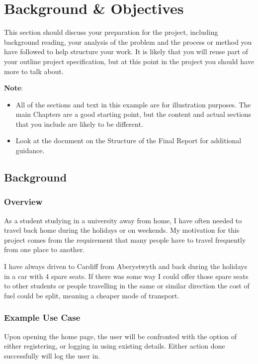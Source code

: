 \chapter{Background \& Objectives}

This section should discuss your preparation for the project, including background reading, your analysis of the problem and the process or method you have followed to help structure your work.  It is likely that you will reuse part of your outline project specification, but at this point in the project you should have more to talk about. 

\textbf{Note}: 

\begin{itemize}
   \item All of the sections and text in this example are for illustration purposes. The main Chapters are a good starting point, but the content and actual sections that you include are likely to be different.
   
   \item Look at the document on the Structure of the Final Report for additional guidance. 
   
\end {itemize}

\section{Background}
\subsection{Overview}
As a student studying in a university away from home, I have often needed to travel back home during the holidays or on weekends. My motivation for this project comes from the requirement that many people have to travel frequently from one place to another. 

I have always driven to Cardiff from Aberystwyth and back during the holidays in a car with 4 spare seats. If there was some way I could offer those spare seats to other students or people travelling in the same or similar direction the cost of fuel could be split, meaning a cheaper mode of transport.

\subsection{Example Use Case}
	Upon opening the home page, the user will be confronted with  the option of either registering, or logging in using existing details. Either action done successfully will log the user in.
	
